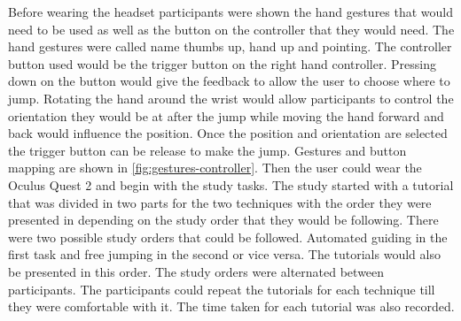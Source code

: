 Before wearing the headset participants were shown the hand gestures that would need to be used as well as the button on the controller that they would need. The hand gestures were called name thumbs up, hand up and pointing. The controller button used would be the trigger button on the right hand controller. Pressing down on the button would give the feedback to allow the user to choose where to jump. Rotating the hand around the wrist would allow participants to control the orientation they would be at after the jump while moving the hand forward and back would influence the position. Once the position and orientation are selected the trigger button can be release to make the jump. Gestures and button mapping are shown in \cref{fig:gestures-controller}. Then the user could wear the Oculus Quest 2 and begin with the study tasks. The study started with a tutorial that was divided in two parts for the two techniques with the order they were presented in depending on the study order that they would be following. There were two possible study orders that could be followed. Automated guiding in the first task and free jumping in the second or vice versa. The tutorials would also be presented in this order. The study orders were alternated between participants. The participants could repeat the tutorials for each technique till they were comfortable with it. The time taken for each tutorial was also recorded. 

